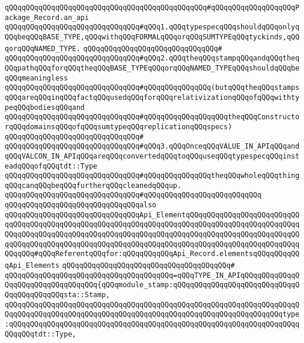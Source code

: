 \verb|qQQqqQQqqQQqqQQqqQQqqQQqqQQqqQQqqQQqqQQqqQQqqQQq#qQQqqQQqqQQqqQQqqQQqPackage_Record.an_api|\newline
\newline
\verb|qQQqqQQqqQQqqQQqqQQqqQQqqQQqqQQq#qQQq1.qQQqtypespecqQQqshouldqQQqonlyqQQqbeqQQqBASE_TYPE,qQQqwithqQQqFORMALqQQqorqQQqSUMTYPEqQQqtyckinds,qQQqorqQQqNAMED_TYPE.|\newline
\verb|qQQqqQQqqQQqqQQqqQQqqQQqqQQqqQQq#|\newline
\verb|qQQqqQQqqQQqqQQqqQQqqQQqqQQqqQQq#qQQq2.qQQqtheqQQqstampqQQqandqQQqtheqQQqpathqQQqforqQQqtheqQQqBASE_TYPEqQQqorqQQqNAMED_TYPEqQQqshouldqQQqbeqQQqmeaningless|\newline
\verb|qQQqqQQqqQQqqQQqqQQqqQQqqQQqqQQq#qQQqqQQqqQQqqQQq(butqQQqtheqQQqstampsqQQqareqQQqinqQQqfactqQQqusedqQQqforqQQqrelativizationqQQqofqQQqwithtypeqQQqbodiesqQQqand|\newline
\verb|qQQqqQQqqQQqqQQqqQQqqQQqqQQqqQQq#qQQqqQQqqQQqqQQqqQQqtheqQQqConstructorqQQqdomainsqQQqofqQQqsumtypeqQQqreplicationqQQqspecs)|\newline
\verb|qQQqqQQqqQQqqQQqqQQqqQQqqQQqqQQq#|\newline
\verb|qQQqqQQqqQQqqQQqqQQqqQQqqQQqqQQq#qQQq3.qQQqOnceqQQqVALUE_IN_APIqQQqandqQQqVALCON_IN_APIqQQqareqQQqconvertedqQQqtoqQQquseqQQqtypespecqQQqinsteadqQQqofqQQqtdt::Type|\newline
\verb|qQQqqQQqqQQqqQQqqQQqqQQqqQQqqQQq#qQQqqQQqqQQqqQQqtheqQQqwholeqQQqthingqQQqcanqQQqbeqQQqfurtherqQQqcleanedqQQqup.|\newline
\verb|qQQqqQQqqQQqqQQqqQQqqQQqqQQqqQQq#qQQqqQQqqQQqqQQqqQQqqQQqqQQq|\newline
\verb|qQQqqQQqqQQqqQQqqQQqqQQqqQQqqQQqalso|\newline
\verb|qQQqqQQqqQQqqQQqqQQqqQQqqQQqqQQqApi_ElementqQQqqQQqqQQqqQQqqQQqqQQqqQQqqQQqqQQqqQQqqQQqqQQqqQQqqQQqqQQqqQQqqQQqqQQqqQQqqQQqqQQqqQQqqQQqqQQqqQQqqQQqqQQqqQQqqQQqqQQqqQQqqQQqqQQqqQQqqQQqqQQqqQQqqQQqqQQqqQQqqQQqqQQqqQQqqQQqqQQqqQQqqQQqqQQqqQQqqQQqqQQqqQQqqQQqqQQqqQQqqQQqqQQqqQQqqQQqqQQqqQQq#qQQqReferentqQQqfor:qQQqqQQqqQQqApi_Record.elementsqQQqqQQqqQQqApi_Elements|\newline
\verb|qQQqqQQqqQQqqQQqqQQqqQQqqQQqqQQqqQQqqQQq#|\newline
\verb|qQQqqQQqqQQqqQQqqQQqqQQqqQQqqQQqqQQqqQQq=qQQqTYPE_IN_APIqQQqqQQqqQQqqQQqqQQqqQQqqQQqqQQqqQQq{qQQqmodule_stamp:qQQqqQQqqQQqqQQqqQQqqQQqqQQqqQQqqQQqqQQqqQQqsta::Stamp,|\newline
\verb|qQQqqQQqqQQqqQQqqQQqqQQqqQQqqQQqqQQqqQQqqQQqqQQqqQQqqQQqqQQqqQQqqQQqqQQqqQQqqQQqqQQqqQQqqQQqqQQqqQQqqQQqqQQqqQQqqQQqqQQqqQQqqQQqqQQqqQQqtype:qQQqqQQqqQQqqQQqqQQqqQQqqQQqqQQqqQQqqQQqqQQqqQQqqQQqqQQqqQQqqQQqqQQqqQQqqQQqtdt::Type,|\newline
